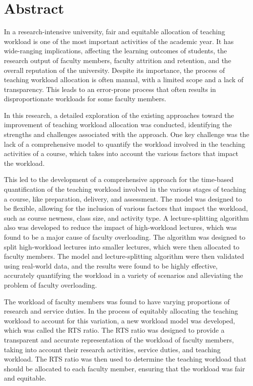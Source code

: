 
\chapter*{Abstract}

In a research-intensive university, fair and equitable allocation of teaching workload is one of the most important activities of the academic year. It has wide-ranging implications, affecting the learning outcomes of students, the research output of faculty members, faculty attrition and retention, and the overall reputation of the university. Despite its importance, the process of teaching workload allocation is often manual, with a limited scope and a lack of transparency. This leads to an error-prone process that often results in disproportionate workloads for some faculty members.

In this research, a detailed exploration of the existing approaches toward the improvement of teaching workload allocation was conducted, identifying the strengths and challenges associated with the approach. One key challenge was the lack of a comprehensive model to quantify the workload involved in the teaching activities of a course, which takes into account the various factors that impact the workload.

This led to the development of a comprehensive approach for the time-based quantification of the teaching workload involved in the various stages of teaching a course, like preparation, delivery, and assessment. The model was designed to be flexible, allowing for the inclusion of various factors that impact the workload, such as course newness, class size, and activity type. A lecture-splitting algorithm also was developed to reduce the impact of high-workload lectures, which was found to be a major cause of faculty overloading. The algorithm was designed to split high-workload lectures into smaller lectures, which were then allocated to faculty members. The model and lecture-splitting algorithm were then validated using real-world data, and the results were found to be highly effective, accurately quantifying the workload in a variety of scenarios and alleviating the problem of faculty overloading.

The workload of faculty members was found to have varying proportions of research and service duties. In the process of equitably allocating the teaching workload to account for this variation, a new workload model was developed, which was called the RTS ratio. The RTS ratio was designed to provide a transparent and accurate representation of the workload of faculty members, taking into account their research activities, service duties, and teaching workload. The RTS ratio was then used to determine the teaching workload that should be allocated to each faculty member, ensuring that the workload was fair and equitable.

